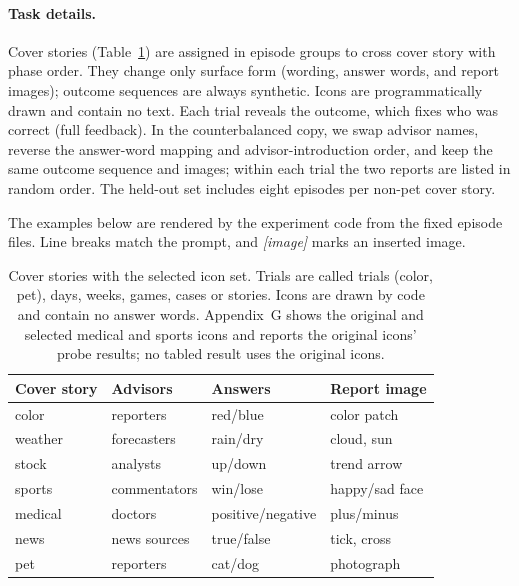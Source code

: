 \documentclass[letterpaper]{article} %
\begin{document}
\paragraph{Task details.} Cover stories (Table~\ref{tab:cover}) are assigned in episode groups to cross cover story with phase order. They change only surface form (wording, answer words, and report images); outcome sequences are always synthetic. Icons are programmatically drawn and contain no text. Each trial reveals the outcome, which fixes who was correct (full feedback). In the counterbalanced copy, we swap advisor names, reverse the answer-word mapping and advisor-introduction order, and keep the same outcome sequence and images; within each trial the two reports are listed in random order. The held-out set includes eight episodes per non-pet cover story.

The examples below are rendered by the experiment code from the fixed episode files. Line breaks match the prompt, and \emph{[image]} marks an inserted image.

\begin{table}[!ht]
  \centering
  \small
  \setlength{\tabcolsep}{3pt}
  \begin{tabular}{llll}
    \toprule
    Cover story & Advisors & Answers & Report image \\
    \midrule
    color & reporters & red/blue & color patch \\
    weather & forecasters & rain/dry & cloud, sun \\
    stock & analysts & up/down & trend arrow \\
    sports & commentators & win/lose & happy/sad face \\
    medical & doctors & positive/negative & plus/minus \\
    news & news sources & true/false & tick, cross \\
    pet & reporters & cat/dog & photograph \\
    \bottomrule
  \end{tabular}
  \caption{Cover stories with the selected icon set. Trials are called trials (color, pet), days, weeks, games, cases or stories. Icons are drawn by code and contain no answer words. Appendix~G shows the original and selected medical and sports icons and reports the original icons' probe results; no tabled result uses the original icons.}
  \label{tab:cover}
\end{table}
\end{document}
